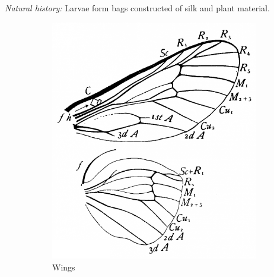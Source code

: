 \documentclass[letterpaper, 11pt]{article}
\begin{document}
\noindent{}\textit{Natural history:} Larvae form bags constructed of silk and plant material.

\begin{figure}[ht!]
    \centering
    \begin{subfigure}[ht!]{0.36\textwidth}
        \includegraphics[width=\textwidth]{PsychidWings}%
        \caption{Wings}
        \label{fig:psychid1}
    \end{subfigure}
    ~ %
    \begin{subfigure}[ht!]{0.15\textwidth}

\end{subfigure}
\end{figure}
\end{document}
